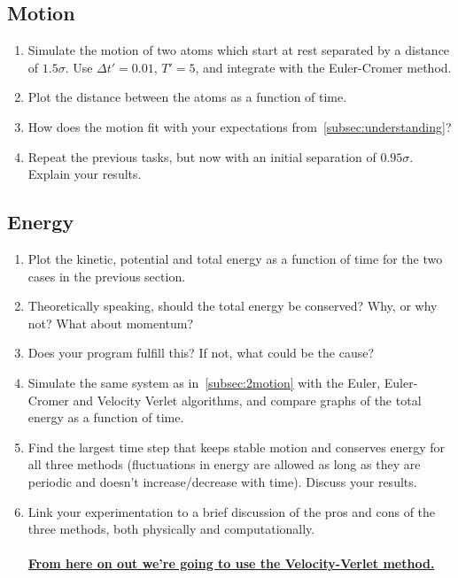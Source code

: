 \documentclass[11pt,british,a4paper]{report}
\begin{document}
\subsection{Motion}\label{subsec:2motion}
\begin{enumerate}[label=\roman*.]
    \item Simulate the motion of two atoms which start at rest separated by a distance of \(\num{1.5}\sigma\). Use \(\Delta t'=\num{0.01}\), \(T' = 5\), and integrate with the Euler-Cromer method.
    \item Plot the distance between the atoms as a function of time.
    \item How does the motion fit with your expectations from~\vref{subsec:understanding}?
    \item Repeat the previous tasks, but now with an initial separation of \(\num{0.95}\sigma\). Explain your results.
\end{enumerate}

\subsection{Energy}
\begin{enumerate}[label=\roman*.]
    \item Plot the kinetic, potential and total energy as a function of time for the two cases in the previous section.
    \item Theoretically speaking, should the total energy be conserved? Why, or why not? What about momentum?
    \item Does your program fulfill this? If not, what could be the cause?
    \item Simulate the same system as in~\vref{subsec:2motion} with the Euler, Euler-Cromer and Velocity Verlet algorithms, and compare graphs of the total energy as a function of time.
    \item Find the largest time step that keeps stable motion and conserves energy for all three methods (fluctuations in energy are allowed as long as they are periodic and doesn't increase/decrease with time). Discuss your results.
    \item Link your experimentation to a brief discussion of the pros and cons of the three methods, both physically and computationally.
    \\\\ \underline{\textbf{From here on out we're going to use the Velocity-Verlet method.}}
\end{enumerate}
\end{document}
